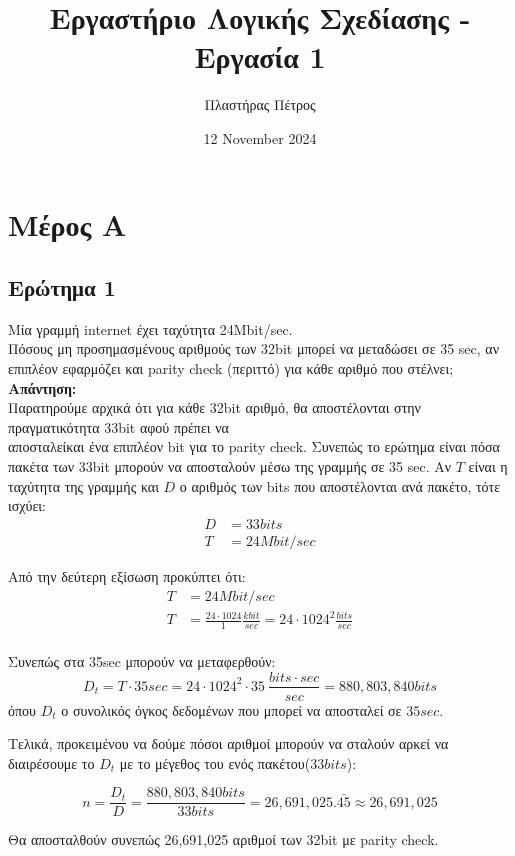 \documentclass[draft]{article}
\author{Πλαστήρας Πέτρος}
\date{12 November 2024}
\title{Εργαστήριο Λογικής Σχεδίασης - Εργασία 1}
\begin{document}
\maketitle

\section{Μέρος Α}
\subsection{Ερώτημα 1}
Μία γραμμή internet έχει ταχύτητα 24Mbit/sec.\\
Πόσους μη προσημασμένους αριθμούς των 32bit μπορεί να μεταδώσει σε 35 sec, 
αν επιπλέον εφαρμόζει και parity check (περιττό) για κάθε αριθμό που στέλνει;\\
\textbf{Απάντηση: }\\
Παρατηρούμε αρχικά ότι για κάθε 32bit αριθμό, θα αποστέλονται στην πραγματικότητα 33bit αφού πρέπει να \\
αποσταλείκαι ένα επιπλέον bit για το parity check. Συνεπώς το ερώτημα είναι πόσα πακέτα των 33bit μπορούν να αποσταλούν μέσω της γραμμής σε 35 sec.
Αν $T$ είναι η ταχύτητα της γραμμής και $D$ ο αριθμός των bits που αποστέλονται ανά πακέτο, τότε ισχύει:
\begin{align*}
  D &= 33bits \\
  T &= 24Mbit/sec
\end{align*}

Από την δεύτερη εξίσωση προκύπτει ότι:
\begin{align*}
  T &= 24Mbit/sec \\
  T &= \frac{24 \cdot 1024}{1} \frac{kbit}{sec} = 24 \cdot 1024^2 \frac{bits}{sec}\\
\end{align*}

Συνεπώς στα 35sec μπορούν να μεταφερθούν:
$$
D_t = T \cdot 35sec = 24 \cdot 1024^2 \cdot 35 \ \frac{bits \cdot sec}{sec} = 880,803,840 bits
$$
όπου $D_t$ ο συνολικός όγκος δεδομένων που μπορεί να αποσταλεί σε $35sec$. 

Τελικά, προκειμένου να δούμε πόσοι αριθμοί μπορούν να σταλούν αρκεί να 
διαιρέσουμε το $D_t$ με το μέγεθος του ενός πακέτου($33bits$):

$$
n = \frac{D_t}{D} = \frac{880,803,840 bits}{33 bits} = 26,691,025.\bar{45} \approx 26,691,025
$$

Θα αποσταλθούν συνεπώς 26,691,025 αριθμοί των 32bit με parity check.
\end{document}
